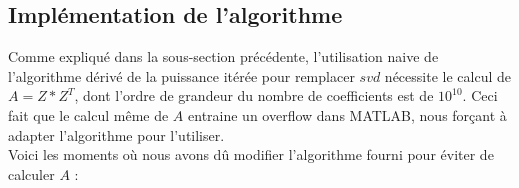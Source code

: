 \documentclass[a4paper,12pt]{article}
\begin{document}
    \subsection{Implémentation de l'algorithme}

    Comme expliqué dans la sous-section précédente, l'utilisation naive de l'algorithme dérivé de la puissance itérée pour remplacer $svd$ nécessite le calcul de $A = Z*Z^T$, dont l'ordre de grandeur du nombre de coefficients est de $10^{10}$. Ceci fait que le calcul même de $A$ entraine un overflow dans MATLAB, nous forçant à adapter l'algorithme pour l'utiliser. \\

    Voici les moments où nous avons dû modifier l'algorithme fourni pour éviter de calculer $A$ : \\
\end{document}
